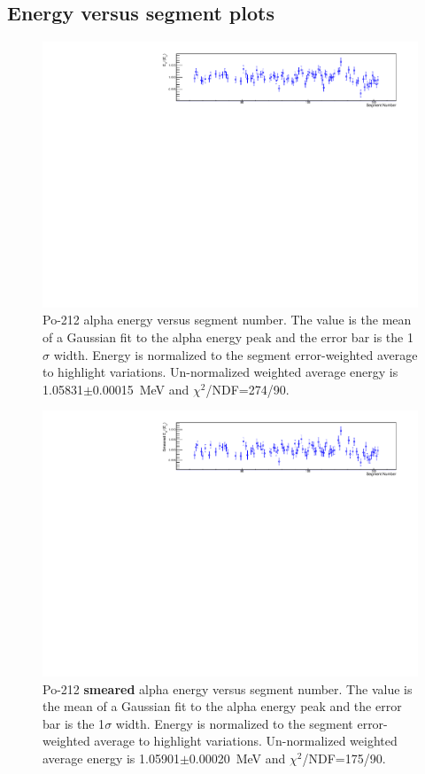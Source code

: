 \subsection{Energy versus segment plots}
\begin{figure}[!h]
\centering
\includegraphics[width=1.05\textwidth]{figures/PubBiPo212EvsCell.pdf}
\caption{\label{fig:EvsCell212}Po-212 alpha energy versus segment number. The value is the mean of a Gaussian fit to the alpha energy peak and the error bar is the 1$\sigma$ width. Energy is normalized to the segment error-weighted average to highlight variations. Un-normalized weighted average energy is 1.05831$\pm$0.00015~MeV and $\chi^2$/NDF=274/90.}
\end{figure}
\begin{figure}[!h]
\centering
\includegraphics[width=1.05\textwidth]{figures/PubBiPo212EsmearvsCell.pdf}
\caption{\label{fig:EsmearvsCell212}Po-212 {\bf smeared} alpha energy versus segment number. The value is the mean of a Gaussian fit to the alpha energy peak and the error bar is the 1$\sigma$ width. Energy is normalized to the segment error-weighted average to highlight variations. Un-normalized weighted average energy is 1.05901$\pm$0.00020~MeV and $\chi^2$/NDF=175/90.}
\end{figure}
